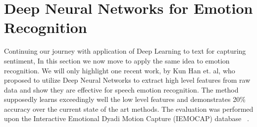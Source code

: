  \section{Deep Neural Networks for Emotion Recognition}
 
 Continuing our journey with application of Deep Learning to text for capturing sentiment, In this section we now move to apply the same idea to emotion recognition. We will only highlight one recent work, by Kun Han et. al, \parencite{deepemotionrecog} who proposed to utilize Deep Neural Networks to extract high level features from raw data and show they are effective for speech emotion recognition. The method supposedly learns exceedingly well the low level features and demonstrates 20\% accuracy over the current state of the art methods. The evaluation was performed upon the Interactive Emotional Dyadi Motion Capture (IEMOCAP) database ~\parencite{iemocap}.  